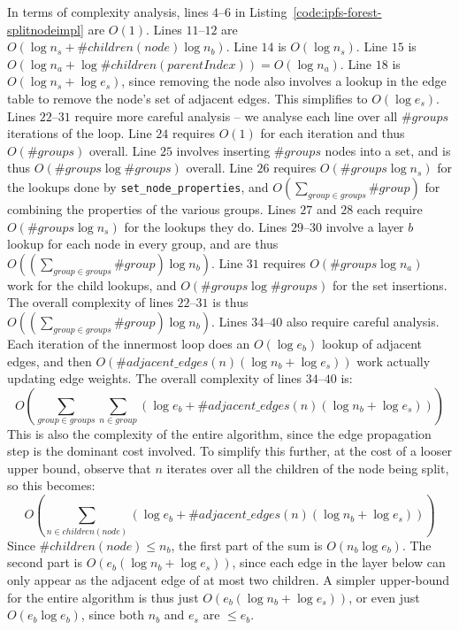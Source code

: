 In terms of complexity analysis, lines $4$--$6$ in Listing~\ref{code:ipfs-forest-splitnodeimpl} are $O(1)$. Lines $11$--$12$ are $O(\log n_s + \#\mathit{children}(node) \log n_b)$. Line $14$ is $O(\log n_s)$. Line $15$ is $O(\log n_a + \log \#\mathit{children}(\mathit{parentIndex})) = O(\log n_a)$. Line $18$ is $O(\log n_s + \log e_s)$, since removing the node also involves a lookup in the edge table to remove the node's set of adjacent edges. This simplifies to $O(\log e_s)$. Lines $22$--$31$ require more careful analysis -- we analyse each line over all $\#\mathit{groups}$ iterations of the loop. Line $24$ requires $O(1)$ for each iteration and thus $O(\#\mathit{groups})$ overall. Line $25$ involves inserting $\#\mathit{groups}$ nodes into a set, and is thus $O(\#\mathit{groups} \log \#\mathit{groups})$ overall. Line $26$ requires $O(\#\mathit{groups} \log n_s)$ for the lookups done by \texttt{set_node_properties}, and $O(\sum_{\mathit{group} \in \mathit{groups}} \#\mathit{group})$ for combining the properties of the various groups. Lines $27$ and $28$ each require $O(\#\mathit{groups} \log n_s)$ for the lookups they do. Lines $29$--$30$ involve a layer $b$ lookup for each node in every group, and are thus $O((\sum_{\mathit{group} \in \mathit{groups}} \#\mathit{group}) \log n_b)$. Line $31$ requires $O(\#\mathit{groups} \log n_a)$ work for the child lookups, and $O(\#\mathit{groups} \log \#\mathit{groups})$ for the set insertions. The overall complexity of lines $22$--$31$ is thus $O((\sum_{\mathit{group} \in \mathit{groups}} \#\mathit{group}) \log n_b)$. Lines $34$--$40$ also require careful analysis. Each iteration of the innermost loop does an $O(\log e_b)$ lookup of adjacent edges, and then $O(\#\mathit{adjacent\_edges}(n) (\log n_b + \log e_s))$ work actually updating edge weights. The overall complexity of lines $34$--$40$ is:
%
\[
O\left( \sum_{\mathit{group} \in \mathit{groups}} \sum_{n \in \mathit{group}} (\log e_b + \#\mathit{adjacent\_edges}(n) (\log n_b + \log e_s)) \right)
\]
%
This is also the complexity of the entire algorithm, since the edge propagation step is the dominant cost involved. To simplify this further, at the cost of a looser upper bound, observe that $n$ iterates over all the children of the node being split, so this becomes:
%
\[
O\left( \sum_{n \in \mathit{children}(node)} (\log e_b + \#\mathit{adjacent\_edges}(n) (\log n_b + \log e_s)) \right)
\]
%
Since $\#\mathit{children}(node) \le n_b$, the first part of the sum is $O(n_b \log e_b)$. The second part is $O(e_b (\log n_b + \log e_s))$, since each edge in the layer below can only appear as the adjacent edge of at most two children. A simpler upper-bound for the entire algorithm is thus just $O(e_b (\log n_b + \log e_s))$, or even just $O(e_b \log e_b)$, since both $n_b$ and $e_s$ are $\le e_b$.

